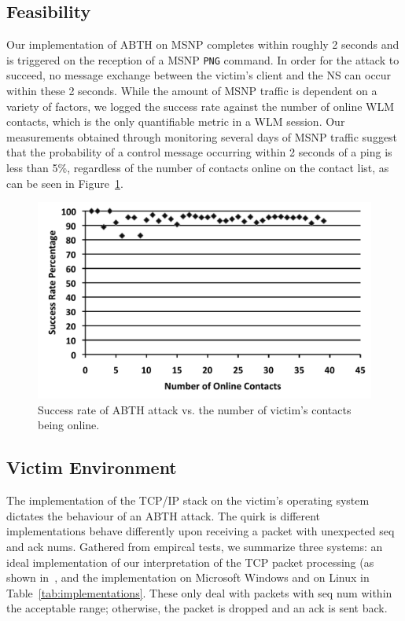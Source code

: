 \documentclass{sig-alternate}
\begin{document}
\vfil\eject

\subsection{Feasibility}
\label{sec:feasibility}

Our implementation of ABTH on MSNP completes within roughly 2 seconds and is triggered on the reception of a MSNP \texttt{PNG} command.
In order for the attack to succeed, no message exchange between the victim's client and the NS can occur within these 2 seconds.
While the amount of MSNP traffic is dependent on a variety of factors, we logged the success rate against the number of online WLM contacts, which is the only quantifiable metric in a WLM session.
Our measurements obtained through monitoring several days of MSNP traffic suggest that the probability of a control message occurring within 2 seconds of a ping is less than 5\%, regardless of the number of contacts online on the contact list, as can be seen in Figure~\ref{fig:successrate}.

\begin{figure}[h]
	\centering
	\caption{Success rate of ABTH attack vs. the number of victim's contacts being online.}
	\label{fig:successrate}
	\includegraphics[width=\columnwidth]{graphics/plot}
\end{figure}

\subsection{Victim Environment}
\label{sec:victimenvironment}

The implementation of the TCP/IP stack on the victim's operating system dictates the behaviour of an ABTH attack.
The quirk is different implementations behave differently upon receiving a packet with unexpected seq and ack nums.
Gathered from empircal tests, we summarize three systems: an ideal implementation of our interpretation of the TCP packet processing (as shown in~\cite{zaghal:model}, and the implementation on Microsoft Windows and on Linux in Table~\ref{tab:implementations}.
These only deal with packets with seq num within the acceptable range; otherwise, the packet is dropped and an ack is sent back.
\end{document}
